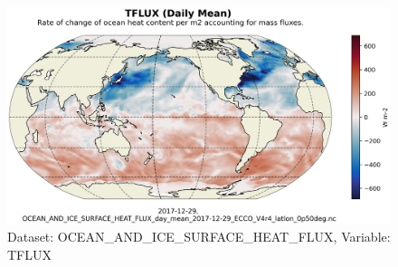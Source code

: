 \begin{figure}[H]
\centering
\includegraphics[scale=0.55]{../images/plots/latlon_plots/Ocean_and_Sea-Ice_Surface_Heat_Fluxes/TFLUX.png}
\caption{Dataset: OCEAN\_AND\_ICE\_SURFACE\_HEAT\_FLUX, Variable: TFLUX}
\label{tab:table-OCEAN_AND_ICE_SURFACE_HEAT_FLUX_TFLUX-Plot}
\end{figure}
\pagebreak
